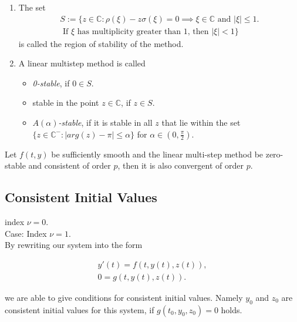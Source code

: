 	\begin{frame}
			\begin{definition}
			\begin{enumerate}
				\item 
				The set
				\begin{equation}
					\begin{aligned}
						S := \{z \in \mathbb{C} : \rho(\xi) - z \sigma(\xi) = 0 \implies \xi \in \mathbb{C} \text{ and } |\xi| \leq 1. \\
						\text{ If $\xi$ has multiplicity greater than $1$, then } |\xi| < 1\}
					\end{aligned}
				\end{equation}
				is called the region of stability of the method.
				\item 
				A linear multistep method is called
				\begin{itemize}
					\item \emph{0-stable}, if $0 \in S$.
					\item stable in the point $z \in \mathbb{C}$, if $z \in S$.
					\item \emph{$A(\alpha)$-stable}, if it is stable in all $z$ that lie within the set $\{z \in \mathbb{C}^- : |arg(z)-\pi| \leq \alpha\}$ for $\alpha \in (0, \frac{\pi}{2})$.		 
				\end{itemize}
			\end{enumerate}
		\end{definition}
	\end{frame}
	
	\begin{frame}
		\begin{theorem}%
			\label{th: null-stbaility and consistence is convergence}
			Let $f(t,y)$ be sufficiently smooth and the linear multi-step method be zero-stable and consistent of order $p$, then it is also convergent of order $p$.
		\end{theorem}
	\end{frame}
	
	\subsection{Consistent Initial Values}
	\begin{frame}
		index $\nu = 0$.\\ 
		
		Case: Index $\nu = 1$.\\
		
		By rewriting our system into the form
		
		\begin{align*}
			y'(t) = f(t,y(t),z(t)), \\
			0 = g(t,y(t),z(t)).
		\end{align*}
		
		we are able to give conditions for consistent initial values. Namely $y_0$ and $z_0$ are consistent initial values for this system, if $g(t_0, y_0, z_0) = 0$ holds.
		
	\end{frame}
	
